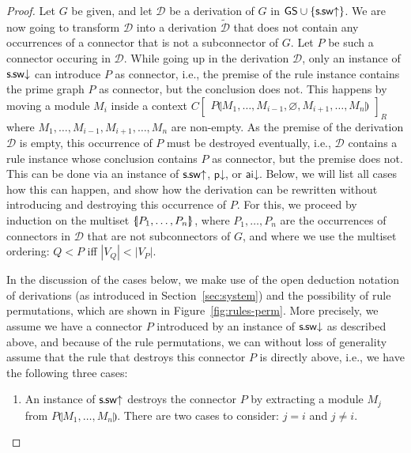\documentclass{lmcs} %
\renewcommand{\emptyset}{\varnothing}
\def\unit{\emptyset}
\newcommand{\connn}[1]{\llparenthesis#1\rrparenthesis}
\newcommand{\Coons}[2]{\!\begin{bmatrix}#1\end{bmatrix}_{\!#2}}  						%
\def\aidr{\dairule}
\def\ssdr{\dssrule}
\def\ssur{\ussrule}
\def\pdr{\dprule}
\def\multiset#1{\{\mkern-5mu|#1|\mkern-5mu\}}
\def\airule{\mathsf{ai}}
\def\dairule{\airule\mathord{\downarrow}}
\def\ssrule{\mathsf{s\mkern-1mu.\mkern-1mu sw}}
\def\ussrule{\ssrule\mathord{\uparrow}}
\def\dssrule{\ssrule\mathord{\downarrow}}
\def\prule{\mathsf{p}}
\def\dprule{\prule\mathord{\downarrow}}
\def\gC{C}
\def\gG{G}
\def\gM{M}
\def\gP{P}
\def\gQ{Q}
\newcommand{\vertices}[1][]{V_{#1}}
\newcommand{\vP}{\vertices[P]}
\newcommand{\vQ}{\vertices[Q]}
\newcommand{\dD}{\mathcal{D}}
\newcommand{\tdD}{\tilde{\mathcal{D}}}
\newcommand{\sizeof}[1]{|#1|}
\theoremstyle{plain}
\begin{document}
\begin{proof}
  Let $\gG$ be given, and let $\dD$ be a derivation of
  $\gG$ in $\GSplus$. We are now going to 
  transform $\dD$ into a derivation $\tdD$ that does not contain any
  occurrences of a connector that is not a subconnector of $\gG$. Let $\gP$
  be such a connector occuring in $\dD$.  While going up in the
  derivation $\dD$, only an instance of $\ssdr$ can introduce $\gP$ as
  connector, i.e., the premise of the rule instance contains the prime
  graph $\gP$ as connector, but the conclusion does not. This happens by
  moving a module $\gM_i$ inside a context $\gC\Coons{\gP\connn{\gM_1,
      \ldots, \gM_{i-1}, \unit, \gM_{i+1}, \ldots, \gM_n}}R$ where
  $\gM_1, \dots,\gM_{i-1},\gM_{i+1}, \dots, \gM_n$ are non-empty. As
  the premise of the derivation $\dD$ is empty, this occurrence of
  $\gP$ must be destroyed eventually, i.e., $\dD$ contains a rule
  instance whose conclusion contains $\gP$ as connector, but the premise
  does not. This can be done via an instance of $\ssur$, $\pdr$, or
  $\aidr$. Below, we will list all cases how this can happen, and show
  how the derivation can be rewritten without introducing and
  destroying this occurrence of $\gP$.  For this, we proceed by
  induction on the multiset $\multiset{P_1,\ldots,P_n}$, where
  $P_1,\ldots,P_n$ are the occurrences of connectors in $\dD$ that are
  not subconnectors of $\gG$, and where we use 
  the multiset ordering:
  $\gQ<\gP$ iff $\sizeof\vQ<\sizeof\vP$.

  In the discussion of the cases below, we make use of the open
  deduction notation of derivations (as introduced in
  Section~\ref{sec:system}) and the possibility of rule permutations,
  which are shown in Figure~\ref{fig:rules-perm}. More precisely, we
  assume we have a connector $\gP$ introduced by an instance of $\ssdr$
  as described above, and because of the rule permutations, we can
  without loss of generality assume that the rule that destroys this
  connector $\gP$ is directly above, i.e., we have the following three
  cases:


  \begin{enumerate}
			
  \item 
    An instance of $\ssur$
    destroys the connector $\gP$ by extracting a module $\gM_j$ from $\gP\connn{\gM_1, \ldots, \gM_n}$.
    There are two cases to consider: $j=i$ and $j\neq i$.
    

\end{enumerate}
\end{proof}
\end{document}
